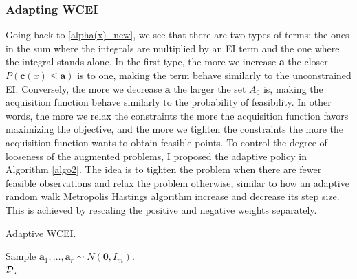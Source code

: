 \subsubsection{Adapting WCEI}
Going back to \eqref{alpha(x)_new}, we see that there are two types of terms: the ones in the sum where the integrals are multiplied by an EI term and the one where the integral stands alone. In the first type, the more we increase $\textbf{a}$ the closer $P(\textbf{c}(x)\le \textbf{a})$ is to one, making the term behave similarly to the unconstrained EI. Conversely, the more we decrease $\textbf{a}$ the larger the set $A_0$ is, making the acquisition function behave similarly to the probability of feasibility. In other words, the more we relax the constraints the more the acquisition function favors maximizing the objective, and the more we tighten the constraints the more the acquisition function wants to obtain feasible points. To control the degree of looseness of the augmented problems, I proposed the adaptive policy in Algorithm \ref{algo2}. The idea is to tighten the problem when there are fewer feasible observations and relax the problem otherwise, similar to how an adaptive random walk Metropolis Hastings algorithm \cite{roberts2009examples} increase and decrease its step size. This is achieved by rescaling the positive and negative weights separately.

\begin{algorithm}[h]
    \caption{Adaptive WCEI.}
    \label{algo2}
    Sample $\textbf{a}_1,\ldots, \textbf{a}_r \sim N(\textbf{0},I_m)$.\\
    \Return $\mathcal{D}$.
\end{algorithm}



